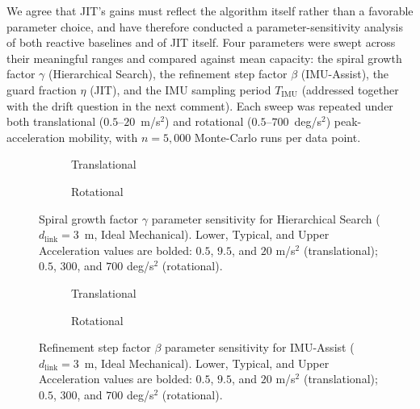 \documentclass{article}
\begin{document}
\noindent We agree that JIT's gains must reflect the algorithm itself rather than a favorable parameter choice, and have therefore conducted a parameter-sensitivity analysis of both reactive baselines and of JIT itself. Four parameters were swept across their meaningful ranges and compared against mean capacity: the spiral growth factor $\gamma$ (Hierarchical Search), the refinement step factor $\beta$ (IMU-Assist), the guard fraction $\eta$ (JIT), and the IMU sampling period $T_{\text{IMU}}$ (addressed together with the drift question in the next comment). Each sweep was repeated under both translational ($0.5$--$20$~m/s$^2$) and rotational ($0.5$--$700$~deg/s$^2$) peak-acceleration mobility, with $n = 5{,}000$ Monte-Carlo runs per data point.\\

\begin{figure}[ht!]
    \centering
    \begin{subfigure}{0.495\linewidth}
        
        \vspace{-25pt}
        \caption{Translational}
    \end{subfigure}
    \hfill
    \begin{subfigure}{0.495\linewidth}
        
        \vspace{-25pt}
        \caption{Rotational}
    \end{subfigure}
    \vspace{-5pt}
    \caption{Spiral growth factor $\gamma$ parameter sensitivity for Hierarchical Search ($d_{\text{link}} = 3$~m, Ideal Mechanical). Lower, Typical, and Upper Acceleration values are bolded: $0.5$, $9.5$, and $20$ m/s$^2$ (translational); $0.5$, $300$, and $700$ deg/s$^2$ (rotational).}
    \vspace{-5pt}
    \label{fig:reb_tuning_hs}
\end{figure}

\begin{figure}[ht!]
    \centering
    \begin{subfigure}{0.495\linewidth}
        
        \vspace{-25pt}
        \caption{Translational}
    \end{subfigure}
    \hfill
    \begin{subfigure}{0.495\linewidth}
        
        \vspace{-25pt}
        \caption{Rotational}
    \end{subfigure}
    \vspace{-5pt}
    \caption{Refinement step factor $\beta$ parameter sensitivity for IMU-Assist ($d_{\text{link}} = 3$~m, Ideal Mechanical). Lower, Typical, and Upper Acceleration values are bolded: $0.5$, $9.5$, and $20$ m/s$^2$ (translational); $0.5$, $300$, and $700$ deg/s$^2$ (rotational).}
    \vspace{-5pt}
    \label{fig:reb_tuning_imu}
\end{figure}
\end{document}
